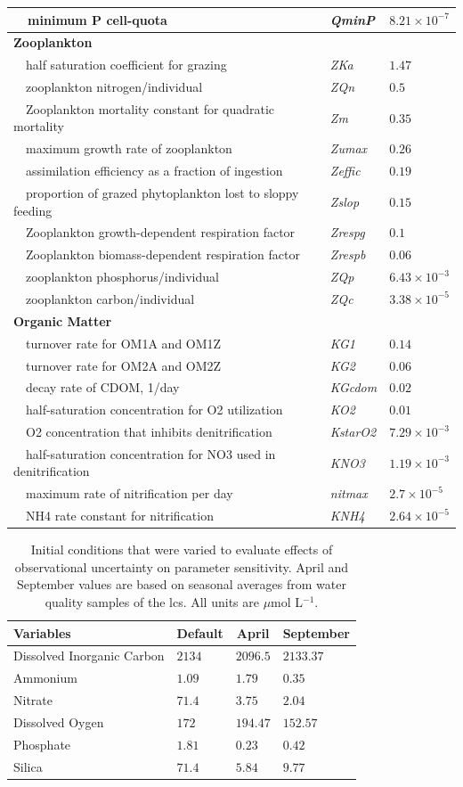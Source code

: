 \documentclass[letterpaper,12pt,oneside]{article}\usepackage[]{graphicx}\usepackage[]{color}
\begin{document}
\begin{table}[!tbp]
{\begin{center}
\begin{tabular}{lll}
~~minimum P cell-quota&\textit{QminP}&$8.21\times 10^{-7}$\tabularnewline
\hline
{\bfseries Zooplankton}&&\tabularnewline
~~half saturation coefficient for grazing&\textit{ZKa}&$1.47$\tabularnewline
~~zooplankton nitrogen/individual&\textit{ZQn}&$0.5$\tabularnewline
~~Zooplankton mortality constant for quadratic mortality&\textit{Zm}&$0.35$\tabularnewline
~~maximum growth rate of zooplankton&\textit{Zumax}&$0.26$\tabularnewline
~~assimilation efficiency as a fraction of ingestion&\textit{Zeffic}&$0.19$\tabularnewline
~~proportion of grazed phytoplankton lost to sloppy feeding&\textit{Zslop}&$0.15$\tabularnewline
~~Zooplankton growth-dependent respiration factor&\textit{Zrespg}&$0.1$\tabularnewline
~~Zooplankton biomass-dependent respiration factor&\textit{Zrespb}&$0.06$\tabularnewline
~~zooplankton phosphorus/individual&\textit{ZQp}&$6.43\times 10^{-3}$\tabularnewline
~~zooplankton carbon/individual&\textit{ZQc}&$3.38\times 10^{-5}$\tabularnewline
\hline
{\bfseries Organic Matter}&&\tabularnewline
~~turnover rate for OM1A and OM1Z&\textit{KG1}&$0.14$\tabularnewline
~~turnover rate for OM2A and OM2Z&\textit{KG2}&$0.06$\tabularnewline
~~decay rate of CDOM, 1/day&\textit{KGcdom}&$0.02$\tabularnewline
~~half-saturation concentration for O2 utilization&\textit{KO2}&$0.01$\tabularnewline
~~O2 concentration that inhibits denitrification&\textit{KstarO2}&$7.29\times 10^{-3}$\tabularnewline
~~half-saturation concentration for NO3 used in denitrification&\textit{KNO3}&$1.19\times 10^{-3}$\tabularnewline
~~maximum rate of nitrification per day&\textit{nitmax}&$2.7\times 10^{-5}$\tabularnewline
~~NH4 rate constant for nitrification&\textit{KNH4}&$2.64\times 10^{-5}$\tabularnewline
\hline
\end{tabular}\end{center}}

\end{table}


\begin{table}[!tbp]
\caption{Initial conditions that were varied to evaluate effects of observational uncertainty on parameter sensitivity.  April and September values are based on seasonal averages from water quality samples of the \ac{lcs}.  All units are $\mu$mol L$^{-1}$.\label{tab:inits}} 
\begin{center}
\begin{tabular}{llll}
\hline\hline
\multicolumn{1}{l}{Variables}&\multicolumn{1}{c}{Default}&\multicolumn{1}{c}{April}&\multicolumn{1}{c}{September}\tabularnewline
\hline
Dissolved Inorganic Carbon&$2134$&$2096.5$&$2133.37$\tabularnewline
Ammonium&$1.09$&$1.79$&$0.35$\tabularnewline
Nitrate&$71.4$&$3.75$&$2.04$\tabularnewline
Dissolved Oygen&$172$&$194.47$&$152.57$\tabularnewline
Phosphate&$1.81$&$0.23$&$0.42$\tabularnewline
Silica&$71.4$&$5.84$&$9.77$\tabularnewline
\hline
\end{tabular}\end{center}

\end{table}
\end{document}
